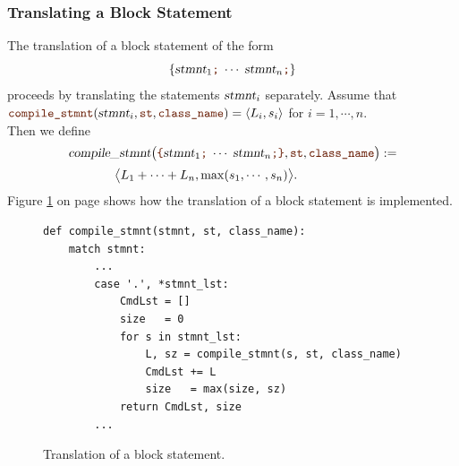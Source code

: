\subsubsection{Translating a Block Statement}
The translation of a block statement of the form
\[ \{ \textsl{stmnt}_1\mytt{;}\; \cdots\; \textsl{stmnt}_n\mytt{;} \} \]
proceeds by translating the statements $\textsl{stmnt}_i$ separately.  Assume that
\\[0.2cm]
\hspace*{1.3cm}
$\mytt{compile\_stmnt}(\textsl{stmnt}_i, \mytt{st}, \mytt{class\_name}) = \pair(L_i, s_i)$
\quad for $i=1,\cdots,n$.
\\[0.2cm]
Then we define
\[
  \begin{array}{l}
     \textsl{compile\_stmnt}\bigl(\mytt{\{} \textsl{stmnt}_1\mytt{;}\; \cdots\; \textsl{stmnt}_n\mytt{;} \mytt{\}},
     \mytt{st}, \mytt{class\_name}\bigr) := \\[0.2cm]
     \hspace*{1.3cm} \bigl\langle L_1 + \cdots + L_n, \max(s_1, \cdots, s_n) \bigr\rangle.
  \end{array}
\]
Figure \ref{fig:Compiler.ipynb:compile:block} on page \pageref{fig:Compiler.ipynb:compile:block} shows how the
translation of a block statement is implemented.

\begin{figure}[!ht]
\centering
\begin{verbatim}
def compile_stmnt(stmnt, st, class_name):
    match stmnt:
        ...
        case '.', *stmnt_lst:
            CmdLst = []
            size   = 0
            for s in stmnt_lst:
                L, sz = compile_stmnt(s, st, class_name)
                CmdLst += L
                size   = max(size, sz)
            return CmdLst, size
        ...
\end{verbatim}
\vspace*{-0.3cm}
\caption{Translation of a block statement.}
\label{fig:Compiler.ipynb:compile:block}
\end{figure}


